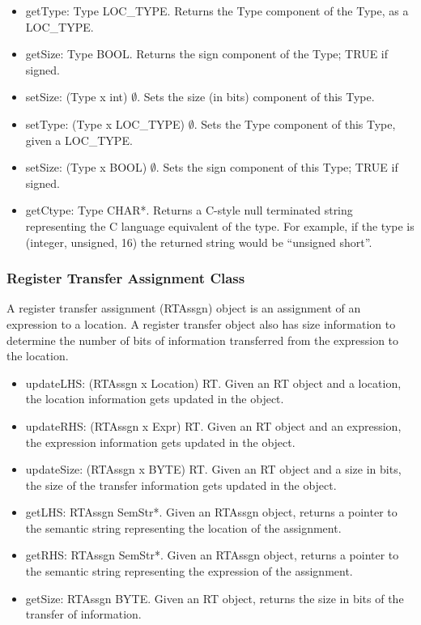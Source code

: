 \begin{itemize}
\item   getType: Type \ra LOC\_TYPE.
    Returns the Type component of the Type, as a LOC\_TYPE.

\item   getSize: Type \ra BOOL.
    Returns the sign component of the Type; TRUE if signed.

\item   setSize: (Type x int) \ra $\emptyset$.
    Sets the size (in bits) component of this Type.

\item   setType: (Type x LOC\_TYPE) \ra $\emptyset$.
    Sets the Type component of this Type, given a LOC\_TYPE.

\item   setSize: (Type x BOOL) \ra $\emptyset$.
    Sets the sign component of this Type; TRUE if signed.

\item   getCtype: Type \ra CHAR*.
    Returns a C-style null terminated string representing the C language
    equivalent of the type. For example, if the type is (integer, unsigned, 16)
    the returned string would be ``unsigned short''.

\end{itemize}


\subsubsection{Register Transfer Assignment Class}
A register transfer assignment (RTAssgn) object is an assignment of an
expression
to a location.  A register transfer object also has size information
to determine the number of bits of information transferred from
the expression to the location.

\begin{itemize}
\item  updateLHS: (RTAssgn x Location) \ra RT.
    Given an RT object and a location, the location
    information gets updated in the object.

\item  updateRHS: (RTAssgn x Expr) \ra RT.
    Given an RT object and an expression, the expression
    information gets updated in the object.

\item  updateSize: (RTAssgn x BYTE) \ra RT.
    Given an RT object and a size in bits, the size of the
    transfer information gets updated in the object.

\item  getLHS: RTAssgn \ra SemStr*.
    Given an RTAssgn object, returns a pointer to the semantic string
    representing the location of the assignment.

\item  getRHS: RTAssgn \ra SemStr*.
    Given an RTAssgn object, returns a pointer to the semantic string
    representing the expression of the assignment.

\item  getSize: RTAssgn \ra BYTE.
    Given an RT object, returns the size in bits of the transfer
    of information.
\end{itemize}


